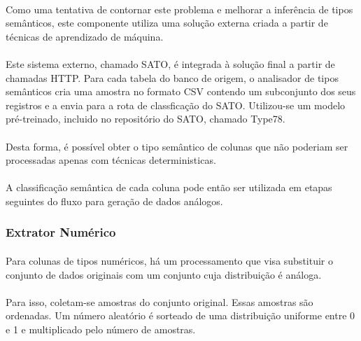 \paragraph{} Como uma tentativa de contornar este problema e melhorar a inferência de tipos semânticos, este componente utiliza uma solução externa criada a partir de técnicas de aprendizado de máquina.

\paragraph{} Este sistema externo, chamado SATO\cite{zhang2019sato}, é integrada à solução final a partir de chamadas HTTP. Para cada tabela do banco de origem, o analisador de tipos semânticos cria uma amostra no formato CSV contendo um subconjunto dos seus registros e a envia para a rota de classficação do SATO. Utilizou-se um modelo pré-treinado, incluido no repositório do SATO, chamado Type78.

\paragraph{} Desta forma, é possível obter o tipo semântico de colunas que não poderiam ser processadas apenas com técnicas deterministicas.

\paragraph{} A classificação semântica de cada coluna pode então ser utilizada em etapas seguintes do fluxo para geração de dados análogos.

\subsubsection{Extrator Numérico}

\paragraph{} Para colunas de tipos numéricos, há um processamento que visa substituir o conjunto de dados originais com um conjunto cuja distribuição é análoga.

\paragraph{} Para isso, coletam-se amostras do conjunto original. Essas amostras são ordenadas. Um número aleatório é sorteado de uma distribuição uniforme entre 0 e 1 e multiplicado pelo número de amostras.

